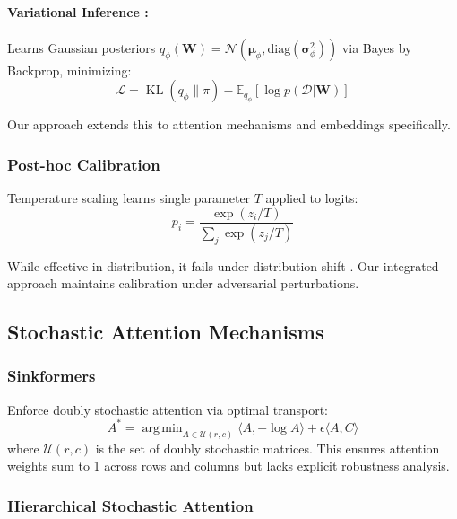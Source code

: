\documentclass[12pt,a4paper]{article}
\theoremstyle{definition}
\DeclareMathOperator{\KL}{KL}
\DeclareMathOperator*{\argmin}{arg\,min}
\begin{document}
\paragraph{Variational Inference \citep{blundell2015weight}:}
Learns Gaussian posteriors $q_\phi(\bm{W}) = \mathcal{N}(\bm{\mu}_\phi, \text{diag}(\bm{\sigma}_\phi^2))$ via Bayes by Backprop, minimizing:
\begin{equation}
\mathcal{L} = \KL(q_\phi\|\pi) - \mathbb{E}_{q_\phi}[\log p(\mathcal{D}|\bm{W})]
\end{equation}

Our approach extends this to attention mechanisms and embeddings specifically.

\subsubsection{Post-hoc Calibration}

Temperature scaling \citep{guo2017calibration} learns single parameter $T$ applied to logits:
\begin{equation}
p_i = \frac{\exp(z_i/T)}{\sum_j \exp(z_j/T)}
\end{equation}

While effective in-distribution, it fails under distribution shift \citep{desai2020calibration}. Our integrated approach maintains calibration under adversarial perturbations.

\subsection{Stochastic Attention Mechanisms}

\subsubsection{Sinkformers \citep{sander2023sinkformers}}

Enforce doubly stochastic attention via optimal transport:
\begin{equation}
A^* = \argmin_{A \in \mathcal{U}(r,c)} \langle A, -\log A \rangle + \epsilon \langle A, C \rangle
\end{equation}
where $\mathcal{U}(r,c)$ is the set of doubly stochastic matrices. This ensures attention weights sum to 1 across rows and columns but lacks explicit robustness analysis.

\subsubsection{Hierarchical Stochastic Attention \citep{liu2022hierarchical}}
\end{document}
